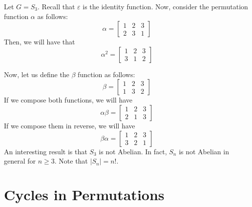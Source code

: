 \begin{nexample}
    Let \(G = S_3\). Recall that \(\varepsilon\) is the identity function. Now, consider the permutation function \(\alpha\) as follows:
    \[
        \alpha = \begin{bmatrix}
            1 & 2 & 3 \\
            2 & 3 & 1
        \end{bmatrix}
    \]
    Then, we will have that
    \[
        \alpha^2 = \begin{bmatrix}
            1 & 2 & 3 \\
            3 & 1 & 2
        \end{bmatrix}
    \]

    Now, let us define the \(\beta\) function as follows:
    \[
        \beta = \begin{bmatrix}
            1 & 2 & 3 \\
            1 & 3 & 2
        \end{bmatrix}
    \]
    If we compose both functions, we will have
    \[
        \alpha\beta = \begin{bmatrix}
            1 & 2 & 3 \\
            2 & 1 & 3
        \end{bmatrix}
    \]
    If we compose them in reverse, we will have
    \[
        \beta\alpha = \begin{bmatrix}
            1 & 2 & 3 \\
            3 & 2 & 1
        \end{bmatrix}
    \]
    An interesting result is that \(S_3\) is not Abelian. In fact, \(S_n\) is not Abelian in general for \(n \geq 3\). Note that \(|S_n| = n!\).
\end{nexample}

\section{Cycles in Permutations}


